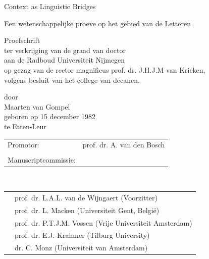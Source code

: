 \documentclass[11pt,makeidx,english]{style/phdthesis}
\author{Maarten van Gompel}
\theoremstyle{break}
\begin{document}
\frontmatter

\pagestyle{plain}



\begin{titlepage}
\begin{center}
\vspace{8cm}
{\Huge Context as Linguistic Bridges}


\vspace{1cm}
Een wetenschappelijke proeve op het gebied van de Letteren

\vspace{6cm}
{\LARGE Proefschrift }\\
\vspace{1cm}
ter verkrijging van de graad van doctor\\
aan de Radboud Universiteit Nijmegen\\
op gezag van de rector magnificus prof. dr. J.H.J.M van Krieken,\\
volgens besluit van het college van decanen.\\

\vspace{2cm}

door\\
\vspace{1cm}
{\LARGE Maarten van Gompel}\\
\vspace{0.5cm}
geboren op 15 december 1982\\
te Etten-Leur


\vspace{0.5cm}


\end{center}

\clearpage

\thispagestyle{empty}
\begin{tabular}{ll}
Promotor: & prof. dr. A. van den Bosch \\
 & \\
Manuscriptcommissie: & \\
\end{tabular}
\\
\begin{tabular}{m{1cm}l}
 & prof. dr. L.A.L. van de Wijngaert (Voorzitter)  \\
 & prof. dr. L. Macken (Universiteit Gent, België) \\
 & prof. dr. P.T.J.M. Vossen (Vrije Universiteit Amsterdam) \\
 & prof. dr. E.J. Krahmer  (Tilburg University) \\
 & dr. C. Monz  (Universiteit van Amsterdam) \\
\end{tabular}



\end{titlepage}
\end{document}
